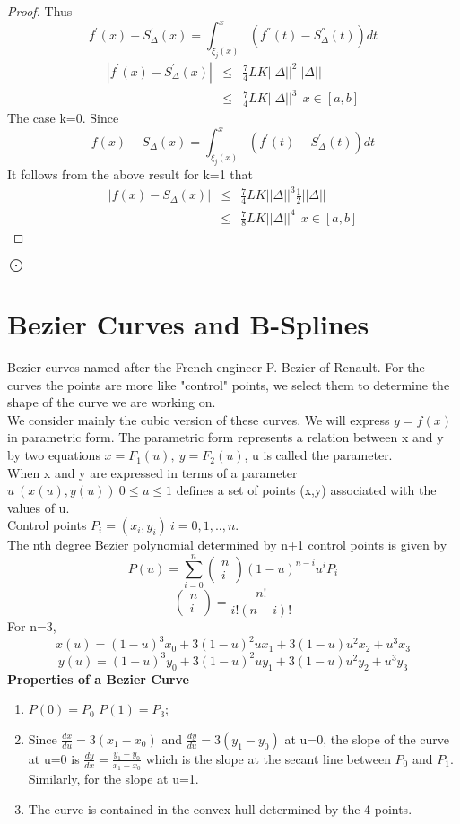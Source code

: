 \begin{proof}
Thus
\[
f^{'}(x)-S^{'}_{\Delta}(x) = \int_{\xi_j(x)}^{x}(f^{''}(t)-S^{''}_{\Delta}(t))dt
\]
\begin{eqnarray*}
|f^{'}(x) - S_{\Delta}^{'}(x)| & \leq & \frac{7}{4} L K ||\Delta||^2 ||\Delta||\\
& \leq & \frac{7}{4}LK||\Delta||^3  \ \ x \in [a,b]
\end{eqnarray*}
The case k=0. Since 
\[
f(x)-S_{\Delta}(x) = \int_{\xi_j(x)}^{x}(f^{'}(t)-S^{'}_{\Delta}(t))dt
\]
It follows from the above result for k=1 that 
\begin{eqnarray*}
|f(x) - S_{\Delta}(x)| & \leq & \frac{7}{4} L K ||\Delta||^3 \frac{1}{2}||\Delta||\\
& \leq & \frac{7}{8}LK||\Delta||^4  \ \ x \in [a,b]
\end{eqnarray*}
\end{proof} $\bigodot$
\section{Bezier Curves and B-Splines}
Bezier curves named after the French engineer P. Bezier of Renault.
For the curves the points are more like "control" points, we select them to determine
the shape of the curve we are working on.\\
We consider mainly the cubic version of these curves. We will express $y=f(x)$ in parametric form.
The parametric form represents a relation between x and y by two equations
$x=F_1(u), \ y=F_2(u)$, u is called the parameter.\\
When x and y are expressed in terms of a parameter $u \  (x(u),y(u)) \ 0\leq u \leq 1$
defines a set of points (x,y) associated with the values of u.\\
Control points $P_i = (x_i,y_i) \ i=0,1,..,n$.\\
The nth degree Bezier polynomial determined by n+1 control points is given by
\[
P(u) = \sum^{n}_{i=0}
\left( \begin{array}{c}
      n \\
      i\end{array} \right)
(1-u)^{n-i}u^i P_i \]
\[
\left( \begin{array}{c}
      n \\
      i\end{array} \right)
= \frac{n!}{i!(n-i)!}
 \]
For n=3,
\[
x(u) = (1-u)^3x_0+3(1-u)^2ux_1+3(1-u)u^2x_2+u^3x_3
\]
\[
y(u) = (1-u)^3y_0+3(1-u)^2uy_1+3(1-u)u^2y_2+u^3y_3
\]
\textbf{Properties of a Bezier Curve}
\begin{enumerate}
\item
$P(0)=P_0$ \hspace{0.2 in} $P(1)=P_3$;
\item
Since $\frac{dx}{du}=3(x_1-x_0)$
and $\frac{dy}{du}=3(y_1-y_0)$ at u=0, the slope of the curve at u=0 is 
$\frac{dy}{dx}=\frac{y_1-y_0}{x_1-x_0}$ which  is the slope at the secant line 
between $P_0$ and $P_1$.  Similarly, for the slope at u=1.
\item
The curve is contained in the convex hull determined by the 4 points.
\end{enumerate}
